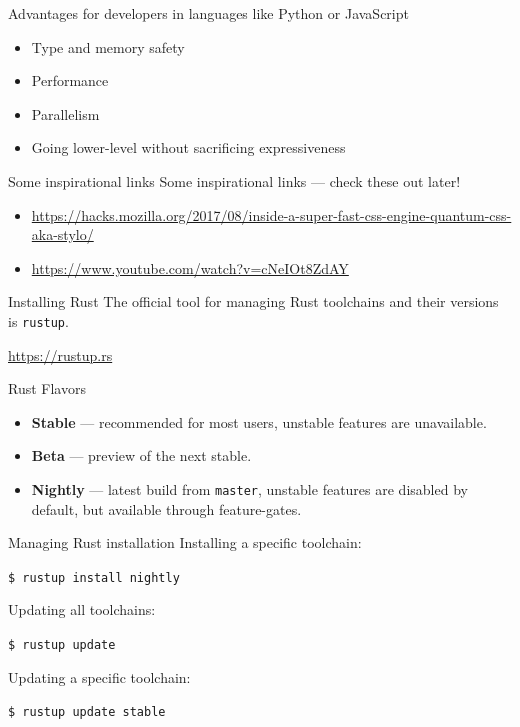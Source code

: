 \documentclass[12pt, aspectratio=169]{beamer}
\begin{document}
\begin{frame}{Advantages for developers in languages like Python or JavaScript}
  \begin{itemize}
    \item Type and memory safety
    \item Performance
    \item Parallelism
    \item Going lower-level without sacrificing expressiveness
  \end{itemize}
\end{frame}

\begin{frame}{Some inspirational links}
  Some inspirational links --- check these out later!

  \begin{itemize}
    \item \url{https://hacks.mozilla.org/2017/08/inside-a-super-fast-css-engine-quantum-css-aka-stylo/}
    \item \url{https://www.youtube.com/watch?v=cNeIOt8ZdAY}
  \end{itemize}
\end{frame}

\begin{frame}{Installing Rust}
  The official tool for managing Rust toolchains and their versions is
  \texttt{rustup}.

  \url{https://rustup.rs}
\end{frame}

\begin{frame}{Rust Flavors}
  \begin{itemize}
    \item \textbf{Stable} --- recommended for most users, unstable features are
      unavailable.
    \item \textbf{Beta} --- preview of the next stable.
    \item \textbf{Nightly} --- latest build from \texttt{master}, unstable
      features are disabled by default, but available through feature-gates.
  \end{itemize}
\end{frame}

\begin{frame}{Managing Rust installation}
  Installing a specific toolchain:

  \texttt{\$ rustup install nightly}

  Updating all toolchains:

  \texttt{\$ rustup update}

  Updating a specific toolchain:

  \texttt{\$ rustup update stable}
\end{frame}
\end{document}
